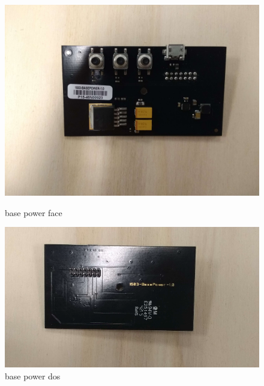 \documentclass{article}
\begin{document}
\begin{figure}[H]
  \centering
  \begin{minipage}[b]{0.45\textwidth}
    \includegraphics[width=\textwidth]{power_face.jpg}
    \caption{base power face}
  \end{minipage}
  \hfill
  \begin{minipage}[b]{0.45\textwidth}
    \includegraphics[width=\textwidth]{power_dos.png}
      \caption{base power dos}
  \end{minipage}
\end{figure}
\end{document}

